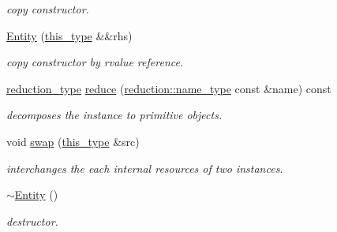 \begin{DoxyCompactItemize}
\begin{DoxyCompactList}\small\item\em copy constructor. \end{DoxyCompactList}\item 
\hypertarget{classhryky_1_1http_1_1header_1_1connection_1_1_entity_aaf314cf8be048b474e89b60082b65bb2}{\hyperlink{classhryky_1_1http_1_1header_1_1connection_1_1_entity_aaf314cf8be048b474e89b60082b65bb2}{Entity} (\hyperlink{classhryky_1_1http_1_1header_1_1connection_1_1_entity_aedaac10cf7686f8bcfd43903ca08cc05}{this\-\_\-type} \&\&rhs)}\label{classhryky_1_1http_1_1header_1_1connection_1_1_entity_aaf314cf8be048b474e89b60082b65bb2}

\begin{DoxyCompactList}\small\item\em copy constructor by rvalue reference. \end{DoxyCompactList}\item 
\hypertarget{classhryky_1_1http_1_1header_1_1connection_1_1_entity_acc919fc4f9090e7d85d7505f999e7a4d}{\hyperlink{namespacehryky_a343a9a4c36a586be5c2693156200eadc}{reduction\-\_\-type} \hyperlink{classhryky_1_1http_1_1header_1_1connection_1_1_entity_acc919fc4f9090e7d85d7505f999e7a4d}{reduce} (\hyperlink{namespacehryky_1_1reduction_ac686c30a4c8d196bbd0f05629a6b921f}{reduction\-::name\-\_\-type} const \&name) const }\label{classhryky_1_1http_1_1header_1_1connection_1_1_entity_acc919fc4f9090e7d85d7505f999e7a4d}

\begin{DoxyCompactList}\small\item\em decomposes the instance to primitive objects. \end{DoxyCompactList}\item 
\hypertarget{classhryky_1_1http_1_1header_1_1connection_1_1_entity_af2b921fdd605dc1d7c99123ad9c3cbb8}{void \hyperlink{classhryky_1_1http_1_1header_1_1connection_1_1_entity_af2b921fdd605dc1d7c99123ad9c3cbb8}{swap} (\hyperlink{classhryky_1_1http_1_1header_1_1connection_1_1_entity_aedaac10cf7686f8bcfd43903ca08cc05}{this\-\_\-type} \&src)}\label{classhryky_1_1http_1_1header_1_1connection_1_1_entity_af2b921fdd605dc1d7c99123ad9c3cbb8}

\begin{DoxyCompactList}\small\item\em interchanges the each internal resources of two instances. \end{DoxyCompactList}\item 
\hypertarget{classhryky_1_1http_1_1header_1_1connection_1_1_entity_a7bb068f6854a8411bb8238826a0ea99a}{\hyperlink{classhryky_1_1http_1_1header_1_1connection_1_1_entity_a7bb068f6854a8411bb8238826a0ea99a}{$\sim$\-Entity} ()}\label{classhryky_1_1http_1_1header_1_1connection_1_1_entity_a7bb068f6854a8411bb8238826a0ea99a}

\begin{DoxyCompactList}\small\item\em destructor. \end{DoxyCompactList}\end{DoxyCompactItemize}
